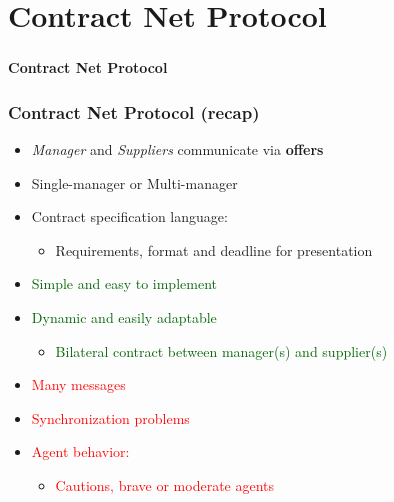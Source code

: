 \section{Contract Net Protocol}

\begin{frame}
	\frametitle{}
	
	\Huge
	
	\vspace{0.5cm}
	
	\begin{center}
		\textbf{Contract Net Protocol}
	\end{center}
\end{frame}

\begin{frame}
	\frametitle{Contract Net Protocol (recap)}
	
	\Large
	
	\begin{itemize}
		\item \emph{Manager} and \emph{Suppliers} communicate via \textbf{offers}
		\vspace{-0.1cm}
		\item Single-manager or Multi-manager
		
		\item Contract specification language:
			  \begin{itemize}
				  \item Requirements, format and deadline for presentation
			  \end{itemize}
		
		\item \textcolor{darkgreen}{Simple and easy to implement}
		
		\item \textcolor{darkgreen}{Dynamic and easily adaptable}
			  \begin{itemize}
			  	  \item \textcolor{darkgreen}{Bilateral contract between manager(s) and supplier(s)}
			  \end{itemize}
		
		\item \textcolor{red}{Many messages}
		\vspace{-0.1cm}
		\item \textcolor{red}{Synchronization problems}
		
		\item \textcolor{red}{Agent behavior:}
			  \begin{itemize}
			  	  \item \textcolor{red}{Cautions, brave or moderate agents}
			  \end{itemize}
	\end{itemize}
\end{frame}

